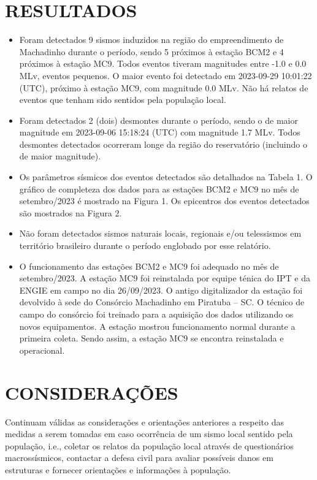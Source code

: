 \section{RESULTADOS}
\label{sec:resultados}
\begin{itemize}
	\item Foram detectados 9 sismos induzidos na região do empreendimento de Machadinho durante o período, sendo 5 próximos à estação BCM2 e 4 próximos à estação MC9. Todos eventos tiveram magnitudes entre -1.0 e 0.0 MLv, eventos pequenos. O maior evento foi detectado em 2023-09-29 10:01:22 (UTC), próximo à estação MC9, com magnitude 0.0 MLv. Não há relatos de eventos que tenham sido sentidos pela população local.  
    \item Foram detectados 2 (dois) desmontes durante o período, sendo o de maior magnitude em 2023-09-06 15:18:24 (UTC) com magnitude 1.7 MLv. Todos desmontes detectados ocorreram longe da região do reservatório (incluindo o de maior magnitude). 
    \item Os parâmetros sísmicos dos eventos detectados são detalhados na Tabela 1. O gráfico de completeza dos dados para as estações BCM2 e MC9 no mês de setembro/2023 é mostrado na Figura 1. Os epicentros dos eventos detectados são mostrados na Figura 2. 
    \item Não foram detectados sismos naturais locais, regionais e/ou telessismos em território brasileiro durante o período englobado por esse relatório. 
    \item O funcionamento das estações BCM2 e MC9 foi adequado no mês de setembro/2023. A estação MC9 foi reinstalada por equipe ténica do IPT e da ENGIE em campo no dia 26/09/2023. O antigo digitalizador da estação foi devolvido à sede do Consórcio Machadinho em Piratuba -- SC. O técnico de campo do consórcio foi treinado para a aquisição dos dados utilizando os novos equipamentos. A estação mostrou funcionamento normal durante a primeira coleta. Sendo assim, a estação MC9 se encontra reinstalada e operacional.
\end{itemize}
    

\section{CONSIDERAÇÕES}
\label{sec:consideracoes}
Continuam válidas as considerações e orientações anteriores a respeito das medidas a serem tomadas em caso ocorrência de um sismo local sentido pela população, i.e., coletar os relatos da população local através de questionários macrossísmicos, contactar a defesa civil para avaliar possíveis danos em estruturas e fornecer orientações e informações à população. 

\assinaturaLucas
\clearpage
\newpage
